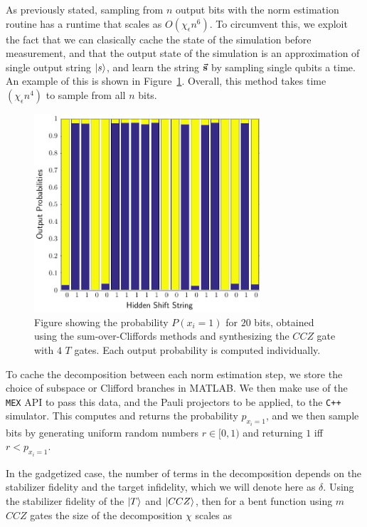 As previously stated, sampling from $n$ output bits with the norm estimation routine has a runtime that scales as $O\left(\chi_{\epsilon}n^{6}\right)$. To circumvent this, we exploit the fact that we can clasically cache the state of the simulation before measurement, and that the output state of the simulation is an approximation of single output string $\ket{s}$, and learn the string $\va{s}$ by sampling single qubits a time. An example of this is shown in Figure~\ref{fig:hs_readout}. Overall, this method takes time $\left(\chi_{\epsilon}n^{4}\right)$ to sample from all $n$ bits.\par
\begin{figure}[t]
\centering
\includegraphics[width=0.75\textwidth]{Figures/HiddenShiftHistogram.pdf}
\caption{Figure showing the probability $P\left(x_{i}=1\right)$ for $20$ bits, obtained using the sum-over-Cliffords methods and synthesizing the $CCZ$ gate with $4$ $T$ gates. Each output probability is computed individually.}
\label{fig:hs_readout}
\end{figure}
To cache the decomposition between each norm estimation step, we store the choice of subspace or Clifford branches in MATLAB. We then make use of the \texttt{MEX} API to pass this data, and the Pauli projectors to be applied, to the \texttt{C++} simulator. This computes and returns the probability $p_{x_{i}=1}$, and we then sample bits by generating uniform random numbers $r\in [0,1)$ and returning $1$ iff $r<p_{x_{i}=1}$.\par
In the gadgetized case, the number of terms in the decomposition depends on the stabilizer fidelity and the target infidelity, which we will denote here as $\delta$. Using the stabilizer fidelity of the $\ket{T}$ and $\ket{CCZ}$, then for a bent function using $m$ $CCZ$ gates the size of the decomposition $\chi$ scales as
